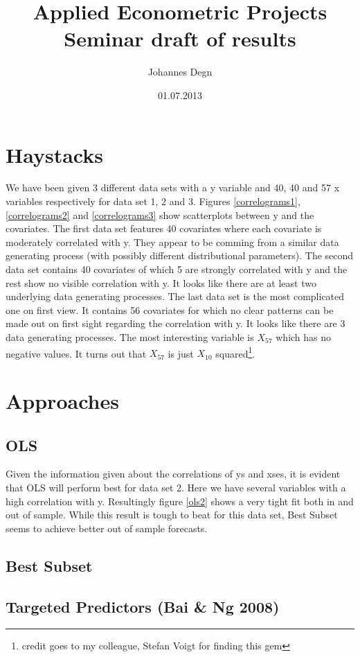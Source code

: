 \documentclass[11pt]{article}
\title{\textbf{Applied Econometric Projects Seminar draft of results}}
\author{Johannes Degn}
\date{01.07.2013}
\begin{document}
\maketitle

\section{Haystacks}

We have been given 3 different data sets with a y variable and 40, 40 and 57 x variables respectively for data set 1, 2 and 3.
Figures \ref{correlograms1}, \ref{correlograms2} and \ref{correlograms3} show scatterplots between y and the covariates. The first data set features 40 covariates where each covariate is moderately correlated with y. They appear to be comming from a similar data generating process (with possibly different distributional parameters).
The second data set contains 40 covariates of which 5 are strongly correlated with y and the rest show no visible correlation with y. It looks like there are at least two underlying data generating processes.
The last data set is the most complicated one on first view. It contains 56 covariates for which no clear patterns can be made out on first sight regarding the correlation with y. It looks like there are 3 data generating processes. The most interesting variable is $X_{57}$ which has no negative values. It turns out that $X_{57}$ is just $X_{10}$ squared\footnote{credit goes to my colleague, Stefan Voigt for finding this gem}.

\section{Approaches}

\subsection{OLS}
Given the information given about the correlations of ys and xses, it is evident that OLS will perform best for data set 2. Here we have several variables with a high correlation with y. Resultingly figure \ref{ols2} shows a very tight fit both in and out of sample. While this result is tough to beat for this data set, Best Subset seems to achieve better out of sample forecasts.
\subsection{Best Subset}
\subsection{Targeted Predictors (Bai \& Ng 2008)}
\end{document}
